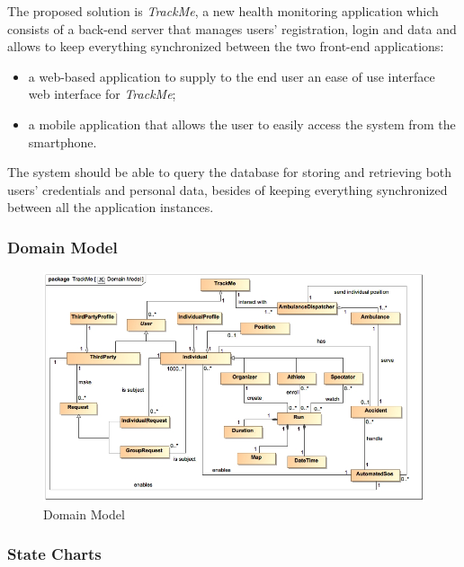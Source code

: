 \documentclass[a4paper]{article}
\begin{document}
    The proposed solution is \textit{TrackMe}, a new health monitoring application which consists of a back-end server that manages users' registration, login and data and allows to keep everything synchronized between the two front-end applications:
        \begin{itemize}
            \item a web-based application to supply to the end user an ease of use interface web interface for \textit{TrackMe};
            \item a mobile application that allows the user to easily access the system from the smartphone.
        \end{itemize}
    
    The system should be able to query the database for storing and retrieving both users' credentials and personal data, besides of keeping everything synchronized between all the application instances.
    
    \subsubsection{Domain Model}
    \begin{figure}[!ht]
        \centering
        \includegraphics[width=\textwidth, keepaspectratio]{images/UML/DomainModel.jpg}
        \caption{Domain Model}
    \end{figure}
    
    \newpage

    \subsubsection{State Charts}
    
\end{document}

